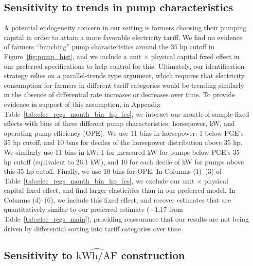 \subsection{Sensitivity to trends in pump characteristics}
\label{app:sens_pump_trends}
A potential endogeneity concern in our setting is farmers choosing their pumping capital in order to attain a more favorable electricity tariff. We find no evidence of farmers ``bunching'' pump characteristics around the 35 hp cutoff in Figure~\ref{fig:pump_hist}, and we include a unit $\times$ physical capital fixed effect in our preferred specifications to help control for this. Ultimately, our identification strategy relies on a parallel-trends type argument, which requires that electricity consumption for farmers in different tariff categories would be trending similarly in the absence of differential rate increases or decreases over time. To provide evidence in support of this assumption, in Appendix Table~\ref{tab:elec_regs_month_bin_hp_fes}, we interact our month-of-sample fixed effects with bins of three different pump characteristics: horsepower, kW, and operating pump efficiency (OPE). We use 11 bins in horsepower: 1 below PGE's 35 hp cutoff, and 10 bins for deciles of the horsepower distribution above 35 hp. We similarly use 11 bins in kW: 1 for measured kW for pumps below PGE's 35 hp cutoff (equivalent to 26.1 kW), and 10 for each decile of kW for pumps above this 35 hp cutoff. Finally, we use 10 bins for OPE. In Columns (1)--(3) of Table~\ref{tab:elec_regs_month_bin_hp_fes}, we exclude our unit $\times$ physical capital fixed effect, and find larger elasticities than in our preferred model. In Columns (4)--(6), we include this fixed effect, and recover estimates that are quantitatively similar to our preferred estimate ($-1.17$ from Table~\ref{tab:elec_regs_main}), providing reassurance that our results are not being driven by differential sorting into tariff categories over time. 


\FloatBarrier

\subsection{Sensitivity to $\widehat{\text{kWh}/\text{AF}}$ construction}
\label{app:sens_kwhaf}

